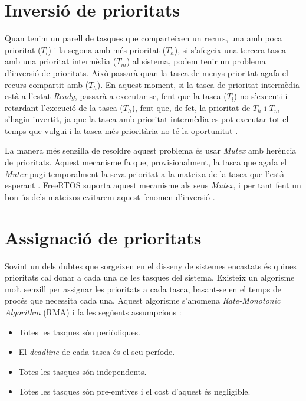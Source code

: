 \section{Inversió de prioritats}
Quan tenim un parell de tasques que comparteixen un recurs, una amb poca prioritat ($T_l$) i la segona amb més prioritat ($T_h$), si s'afegeix una tercera tasca amb una prioritat intermèdia ($T_m$) al sistema, podem tenir un problema d'inversió de prioritats. Això passarà quan la tasca de menys prioritat agafa el recurs compartit amb ($T_h$). En aquest moment, si la tasca de prioritat intermèdia està a l'estat {\em Ready}, passarà a executar-se, fent que la tasca ($T_l$) no s'executi i retardant l'execució de la tasca ($T_h$), fent que, de fet, la prioritat de $T_h$ i $T_m$ s'hagin invertit, ja que la tasca amb prioritat intermèdia es pot executar tot el temps que vulgui i la tasca més prioritària no té la oportunitat \cite[101]{RTEmbeddedSystems}.

La manera més senzilla de resoldre aquest problema és usar {\em Mutex} amb herència de prioritats. Aquest mecanisme fa que, provisionalment, la tasca que agafa el {\em Mutex} pugi temporalment la seva prioritat a la mateixa de la tasca que l'està esperant \cite[106]{RTEmbeddedSystems}. FreeRTOS suporta aquest mecanisme als seus {\em Mutex}, i per tant fent un bon ús dels mateixos evitarem aquest fenomen d'inversió \cite[251]{FreeRTOSBook}.

\section{Assignació de prioritats}
\label{sec:priorities_RMA}
Sovint un dels dubtes que sorgeixen en el disseny de sistemes encastats és quines prioritats cal donar a cada una de les tasques del sistema. Existeix un algorisme molt senzill per assignar les prioritats a cada tasca, basant-se en el temps de procés que necessita cada una. Aquest algorisme s'anomena {\em Rate-Monotonic Algorithm} (RMA) i fa les següents assumpcions \cite{RMA_1}\cite[136]{EmbeddedBook_2}:
\begin{itemize}
 \item Totes les tasques són periòdiques.
 \item El {\em deadline} de cada tasca és el seu període.
 \item Totes les tasques són independents.
 \item Totes les tasques són pre-emtives i el cost d'aquest és negligible.
\end{itemize}

